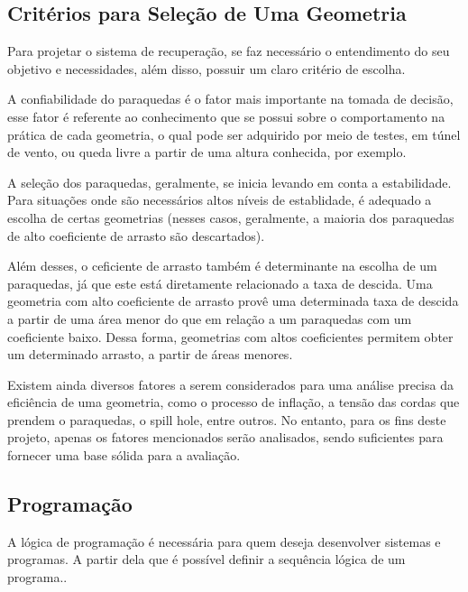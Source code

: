 \documentclass[a4paper, 12pt]{article}[abntex2]
\begin{document}
{            \subsection{Critérios para Seleção de Uma Geometria}
                Para projetar o sistema de recuperação, se faz necessário o entendimento do seu objetivo e necessidades, além disso, possuir um claro critério de escolha.\cite{knacke92}\par 
                A confiabilidade do paraquedas é o fator mais importante na tomada de decisão, esse fator é referente ao conhecimento que se possui sobre o comportamento na prática de cada geometria, o qual pode ser adquirido por meio de testes, em túnel de vento, ou queda livre a partir de uma altura conhecida, por exemplo.\cite{knacke92}\par
                A seleção dos paraquedas, geralmente, se inicia levando em conta a estabilidade. Para situações onde são necessários altos níveis de establidade, é adequado a escolha de certas geometrias (nesses casos, geralmente, a maioria dos paraquedas de alto coeficiente de arrasto são descartados).\cite{knacke92}\par
                Além desses, o ceficiente de arrasto também é determinante na escolha de um paraquedas, já que este está diretamente relacionado a taxa de descida. Uma geometria com alto coeficiente de arrasto provê uma determinada taxa de descida a partir de uma área menor do que em relação a um paraquedas com um coeficiente baixo. Dessa forma, geometrias com altos coeficientes permitem obter um determinado arrasto, a partir de áreas menores.\cite{knacke92}\par
                Existem ainda diversos fatores a serem considerados para uma análise precisa da eficiência de uma geometria, como o processo de inflação, a tensão das cordas que prendem o paraquedas, o spill hole, entre outros. No entanto, para os fins deste projeto, apenas os fatores mencionados serão analisados, sendo suficientes para fornecer uma base sólida para a avaliação.
    
            \subsection{Programação}
                A lógica de programação é necessária para quem deseja desenvolver sistemas e programas. A partir dela que é possível definir a sequência lógica de um programa.\cite{costaalgoritmos}.
}
\end{document}
